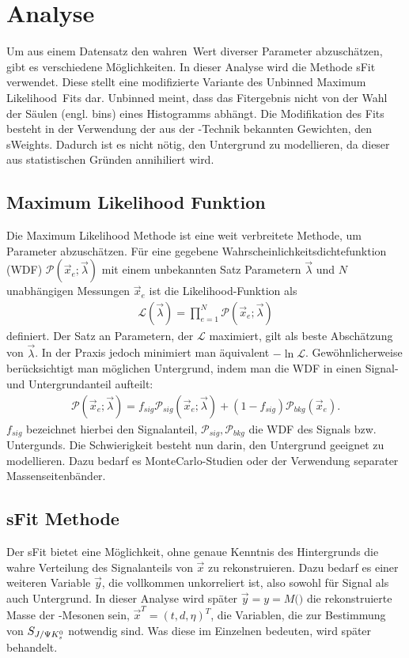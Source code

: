 \chapter{Analyse} \label{kap:analyse}
Um aus einem Datensatz den \glqq wahren\grqq\ Wert diverser Parameter abzuschätzen, gibt es verschiedene Möglichkeiten. In dieser Analyse wird die Methode sFit verwendet. Diese stellt eine modifizierte Variante des \glqq Unbinned Maximum Likelihood\grqq\ Fits dar. Unbinned meint, dass das Fitergebnis nicht von der Wahl der Säulen (engl. bins) eines Histogramms abhängt. Die Modifikation des Fits besteht in der Verwendung der aus der \SPlot-Technik bekannten Gewichten, den sWeights. Dadurch ist es nicht nötig, den Untergrund zu modellieren, da dieser aus statistischen Gründen annihiliert wird.

\section{Maximum Likelihood Funktion}
Die Maximum Likelihood Methode ist eine weit verbreitete Methode, um Parameter abzuschätzen. Für eine gegebene Wahrscheinlichkeitsdichtefunktion (WDF) $\mathcal{P}(\vec{x}_e;\vec{\lambda})$ mit einem unbekannten Satz Parametern $\vec{\lambda}$ und $N$ unabhängigen Messungen $\vec{x}_e$ ist die Likelihood-Funktion als
\begin{align}
\mathcal{L}(\vec{\lambda}) = \prod_{e=1}^N \mathcal{P}(\vec{x}_e;\vec{\lambda})
\end{align}
definiert. Der Satz an Parametern, der $\mathcal{L}$ maximiert, gilt als beste Abschätzung von $\vec{\lambda}$. In der Praxis jedoch minimiert man äquivalent $-\ln\mathcal{L}$. Gewöhnlicherweise berücksichtigt man möglichen Untergrund, indem man die WDF in einen Signal- und Untergrundanteil aufteilt:
\begin{align}
\mathcal{P}(\vec{x}_e;\vec{\lambda}) = f_{sig}\mathcal{P}_{sig}(\vec{x}_e;\vec{\lambda}) + (1-f_{sig})\mathcal{P}_{bkg}(\vec{x}_e). \label{eq:likelihood_sig_bkg}
\end{align}
$f_{sig}$ bezeichnet hierbei den Signalanteil, $\mathcal{P}_{sig}, \mathcal{P}_{bkg}$ die WDF des Signals bzw. Untergunds. Die Schwierigkeit besteht nun darin, den Untergrund geeignet zu modellieren. Dazu bedarf es MonteCarlo-Studien oder der Verwendung separater Massenseitenbänder. \cite{sfit}

\section{sFit Methode} \label{kap:sfit}
Der sFit bietet eine Möglichkeit, ohne genaue Kenntnis des Hintergrunds die wahre Verteilung des Signalanteils von $\vec{x}$ zu rekonstruieren. Dazu bedarf es einer weiteren Variable $\vec{y}$, die vollkommen unkorreliert ist, also sowohl für Signal als auch Untergrund. In dieser Analyse wird später $\vec{y} = y = M($\Bd$)$ die rekonstruierte Masse der \Bd-Mesonen sein, $\vec{x}^T = (t,d,\eta)^T$, die Variablen, die zur Bestimmung von $S_{J/\Psi K_s^0}$ notwendig sind. Was diese im Einzelnen bedeuten, wird später behandelt.

